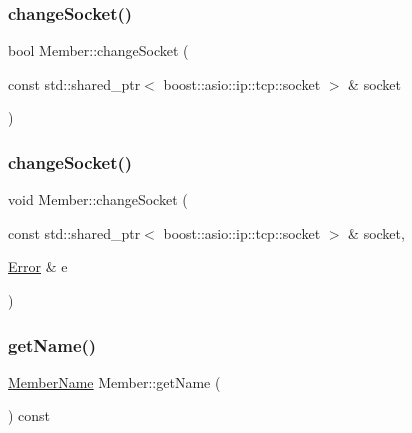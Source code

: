 \subsubsection{\texorpdfstring{change\+Socket()}{changeSocket()}\hspace{0.1cm}{\footnotesize\ttfamily [1/2]}}
{\footnotesize\ttfamily bool Member\+::change\+Socket (\begin{DoxyParamCaption}\item[{const std\+::shared\+\_\+ptr$<$ boost\+::asio\+::ip\+::tcp\+::socket $>$ \&}]{socket }\end{DoxyParamCaption})}

\mbox{\label{classshaan97_1_1sync_1_1_member_a7efb120c7f0020990ec0bb481053370a}} 
\subsubsection{\texorpdfstring{change\+Socket()}{changeSocket()}\hspace{0.1cm}{\footnotesize\ttfamily [2/2]}}
{\footnotesize\ttfamily void Member\+::change\+Socket (\begin{DoxyParamCaption}\item[{const std\+::shared\+\_\+ptr$<$ boost\+::asio\+::ip\+::tcp\+::socket $>$ \&}]{socket,  }\item[{\hyperlink{classshaan97_1_1sync_1_1_error}{Error} \&}]{e }\end{DoxyParamCaption})}

\mbox{\label{classshaan97_1_1sync_1_1_member_a6da04a28e6295aecaf57676f7139a2a2}} 
\subsubsection{\texorpdfstring{get\+Name()}{getName()}}
{\footnotesize\ttfamily \hyperlink{namespaceshaan97_1_1sync_af59c2c9185f7cde547b79fbe0bf8ec71}{Member\+Name} Member\+::get\+Name (\begin{DoxyParamCaption}{ }\end{DoxyParamCaption}) const}

